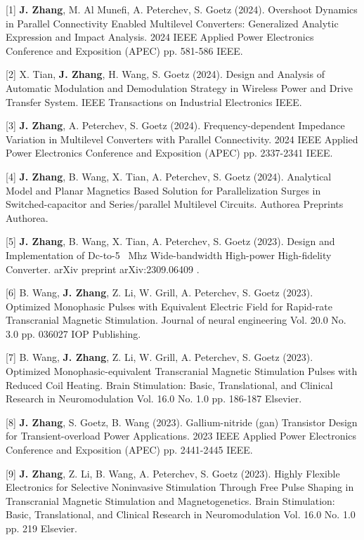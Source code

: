 [1] \textbf{J. Zhang}, M. Al Munefi, A. Peterchev, S. Goetz (2024). Overshoot Dynamics in Parallel Connectivity Enabled Multilevel Converters: Generalized Analytic Expression and Impact Analysis. 2024 IEEE Applied Power Electronics Conference and Exposition (APEC)   pp. 581-586 IEEE.

[2] X. Tian, \textbf{J. Zhang}, H. Wang, S. Goetz (2024). Design and Analysis of Automatic Modulation and Demodulation Strategy in Wireless Power and Drive Transfer System. IEEE Transactions on Industrial Electronics    IEEE.

[3] \textbf{J. Zhang}, A. Peterchev, S. Goetz (2024). Frequency-dependent Impedance Variation in Multilevel Converters with Parallel Connectivity. 2024 IEEE Applied Power Electronics Conference and Exposition (APEC)   pp. 2337-2341 IEEE.

[4] \textbf{J. Zhang}, B. Wang, X. Tian, A. Peterchev, S. Goetz (2024). Analytical Model and Planar Magnetics Based Solution for Parallelization Surges in Switched-capacitor and Series/parallel Multilevel Circuits. Authorea Preprints    Authorea.

[5] \textbf{J. Zhang}, B. Wang, X. Tian, A. Peterchev, S. Goetz (2023). Design and Implementation of Dc-to-5~ Mhz Wide-bandwidth High-power High-fidelity Converter. arXiv preprint arXiv:2309.06409    .

[6] B. Wang, \textbf{J. Zhang}, Z. Li, W. Grill, A. Peterchev, S. Goetz (2023). Optimized Monophasic Pulses with Equivalent Electric Field for Rapid-rate Transcranial Magnetic Stimulation. Journal of neural engineering Vol. 20.0 No. 3.0 pp. 036027 IOP Publishing.

[7] B. Wang, \textbf{J. Zhang}, Z. Li, W. Grill, A. Peterchev, S. Goetz (2023). Optimized Monophasic-equivalent Transcranial Magnetic Stimulation Pulses with Reduced Coil Heating. Brain Stimulation: Basic, Translational, and Clinical Research in Neuromodulation Vol. 16.0 No. 1.0 pp. 186-187 Elsevier.

[8] \textbf{J. Zhang}, S. Goetz, B. Wang (2023). Gallium-nitride (gan) Transistor Design for Transient-overload Power Applications. 2023 IEEE Applied Power Electronics Conference and Exposition (APEC)   pp. 2441-2445 IEEE.

[9] \textbf{J. Zhang}, Z. Li, B. Wang, A. Peterchev, S. Goetz (2023). Highly Flexible Electronics for Selective Noninvasive Stimulation Through Free Pulse Shaping in Transcranial Magnetic Stimulation and Magnetogenetics. Brain Stimulation: Basic, Translational, and Clinical Research in Neuromodulation Vol. 16.0 No. 1.0 pp. 219 Elsevier.

